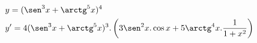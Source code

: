 \begin{ex}
\begin{align}
&y=(\sen^3{x}+\arctg^5{x})^4\nonumber\\
&y'=4(\sen^3{x}+\arctg^5{x})^3.\left(3\sen^2{x}.\cos{x}+5\arctg^4{x}.\frac{1}{1+x^2}\right)\nonumber
\end{align}
\end{ex}